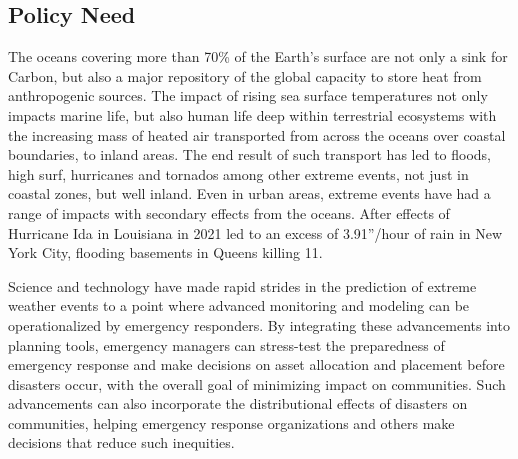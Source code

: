 


\subsection*{Policy Need}

The oceans covering more than 70\% of the Earth's surface are not only
a sink for Carbon, but also a major repository of the global capacity
to store heat from anthropogenic sources. The impact of rising sea
surface temperatures not only impacts marine life, but also human life
deep within terrestrial ecosystems with the increasing mass of heated
air transported from across the oceans over coastal boundaries, to
inland areas. The end result of such transport has led to floods, high
surf, hurricanes and tornados among other extreme events, not just in
coastal zones, but well inland. Even in urban areas, extreme events
have had a range of impacts with secondary effects from the
oceans. After effects of Hurricane Ida in Louisiana in 2021 led to an
excess of 3.91''/hour of rain in New York City, flooding basements in
Queens killing 11. 

Science and technology have made rapid strides in the prediction of
extreme weather events to a point where advanced monitoring and
modeling can be operationalized by emergency responders. By
integrating these advancements into planning tools, emergency managers
can stress-test the preparedness of emergency response and make
decisions on asset allocation and placement before disasters occur,
with the overall goal of minimizing impact on communities. Such
advancements can also incorporate the distributional effects of
disasters on communities, helping emergency response organizations and
others make decisions that reduce such inequities.

